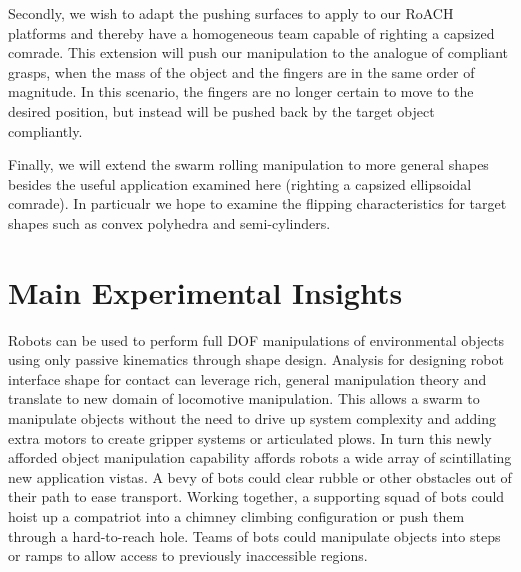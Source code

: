 \documentclass[a4paper]{article}
\begin{document}
Secondly, we wish to adapt the pushing surfaces to apply to our RoACH platforms and thereby have a homogeneous team capable of righting a capsized comrade.
This extension will push our manipulation to the analogue of compliant grasps, when the mass of the object and the fingers are in the same order of magnitude.
In this scenario, the fingers are no longer certain to move to the desired position, but instead will be pushed back by the target object compliantly.

Finally, we will extend the swarm rolling manipulation to more general shapes besides the useful application examined here (righting a capsized ellipsoidal comrade).
In particualr we hope to examine the flipping characteristics for target shapes such as convex polyhedra and semi-cylinders.

\section{Main Experimental Insights}
Robots can be used to perform full DOF manipulations of environmental objects using only passive kinematics through shape design.
Analysis for designing robot interface shape for contact can leverage rich, general manipulation theory and translate to new domain of locomotive manipulation.
This allows a swarm to manipulate objects without the need to drive up system complexity and adding extra motors to create gripper systems or articulated plows.
In turn this newly afforded object manipulation capability affords robots a wide array of scintillating new application vistas.
A bevy of bots could clear rubble or other obstacles out of their path to ease transport.
Working together, a supporting squad of bots could hoist up a compatriot into a chimney climbing configuration or push them through a hard-to-reach hole.
Teams of bots could manipulate objects into steps or ramps to allow access to previously inaccessible regions.

\clearpage


\end{document}
